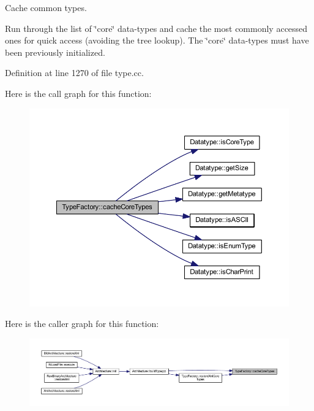 Cache common types. 

Run through the list of \char`\"{}core\char`\"{} data-\/types and cache the most commonly accessed ones for quick access (avoiding the tree lookup). The \char`\"{}core\char`\"{} data-\/types must have been previously initialized. 

Definition at line 1270 of file type.\+cc.

Here is the call graph for this function\+:
\nopagebreak
\begin{figure}[H]
\begin{center}
\leavevmode
\includegraphics[width=350pt]{class_type_factory_a16ccfeecd29c1d5d40ada6b1d4032212_cgraph}
\end{center}
\end{figure}
Here is the caller graph for this function\+:
\nopagebreak
\begin{figure}[H]
\begin{center}
\leavevmode
\includegraphics[width=350pt]{class_type_factory_a16ccfeecd29c1d5d40ada6b1d4032212_icgraph}
\end{center}
\end{figure}
\mbox{\label{class_type_factory_a8497930bbd88dd89d91536de06a79f3f}} 
